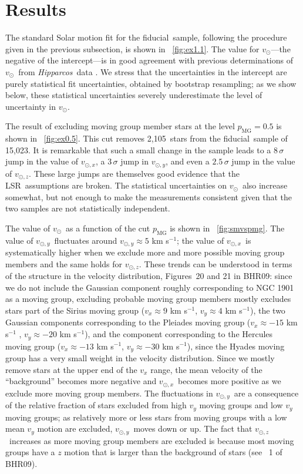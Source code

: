 \documentclass[12pt,preprint]{aastex}
\newcommand{\Hipparcos}{\textsl{Hipparcos}}
\newcommand{\figuresname}{Figures}
\newcommand{\pmg}{p_{\mathrm{MG}}}
\newcommand{\vsunlsr}{\ensuremath{v_\odot}}
\newcommand{\vsunlsrx}{\ensuremath{v_{\odot,x}}}
\newcommand{\vsunlsry}{\ensuremath{v_{\odot,y}}}
\newcommand{\vsunlsrz}{\ensuremath{v_{\odot,z}}}
\newcommand{\lsrabb}{LSR}
\newcommand{\bhr}{BHR09}
\newcommand{\nstars}{15,023}
\newcommand{\nexstars}{2,105}
\newcommand{\fiducial}{fiducial}
\begin{document}
\section{Results}\label{sec:results}

The standard Solar motion fit for the \fiducial\ sample, following the
procedure given in the previous subsection, is shown in
\figurename~\ref{fig:ex1.1}. The value for \vsunlsr---the negative of
the intercept---is in good agreement with previous determinations of
\vsunlsr\ from \Hipparcos\ data \citep{Dehnen98a,Hogg05a,Aumer09a}. We
stress that the uncertainties in the intercept are purely statistical
fit uncertainties, obtained by bootstrap resampling; as we show below,
these statistical uncertainties severely underestimate the level of
uncertainty in \vsunlsr.

The result of excluding moving group member stars at the level $\pmg =
0.5$ is shown in \figurename~\ref{fig:ex0.5}. This cut removes
\nexstars\ stars from the \fiducial\ sample of \nstars. It is
remarkable that such a small change in the sample leads to a
$8\,\sigma$ jump in the value of \vsunlsrx, a $3\,\sigma$ jump in
\vsunlsry, and even a $2.5\,\sigma$ jump in the value of
\vsunlsrz. These large jumps are themselves good evidence that the
\lsrabb\ assumptions are broken. The statistical
uncertainties on \vsunlsr\ also increase somewhat, but not enough to
make the measurements consistent given that the two samples are not
statistically independent.

The value of \vsunlsr\ as a function of the cut $\pmg$ is shown in
\figurename~\ref{fig:smvspmg}. The value of \vsunlsry\ fluctuates
around $\vsunlsry \approx 5$ km s$^{-1}$; the value of \vsunlsrx\ is
systematically higher when we exclude more and more possible moving
group members and the same holds for \vsunlsrz. These trends can be
understood in terms of the structure in the velocity distribution,
\figuresname~20 and 21 in \bhr: since we do not include the Gaussian
component roughly corresponding to NGC 1901 as a moving group,
excluding probable moving group members mostly excludes stars part of
the Sirius moving group ($v_x \approx 9$ km s$^{-1}$, $v_y \approx 4$
km s$^{-1}$), the two Gaussian components corresponding to the
Pleiades moving group ($v_x \approx -15$ km s$^{-1}$ , $v_y \approx
-20$ km s$^{-1}$), and the component corresponding to the Hercules
moving group ($v_x \approx -13$ km s$^{-1}$, $v_y \approx -30$ km
s$^{-1}$), since the Hyades moving group has a very small weight in
the velocity distribution. Since we mostly remove stars at the upper
end of the $v_x$ range, the mean velocity of the ``background''
becomes more negative and \vsunlsrx\ becomes more positive as we
exclude more moving group members. The fluctuations in \vsunlsry\ are
a consequence of the relative fraction of stars excluded from high
$v_y$ moving groups and low $v_y$ moving groups; as relatively more or
less stars from moving groups with a low mean $v_y$ motion are
excluded, \vsunlsry\ moves down or up. The fact that \vsunlsrz\
increases as more moving group members are excluded is because most
moving groups have a $z$ motion that is larger than the background of
stars (see \tablename~1 of \bhr).
\end{document}
